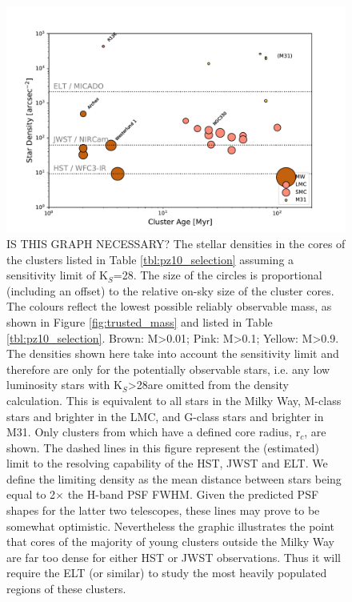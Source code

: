 \begin{figure}

    \centering
    \includegraphics[width=\textwidth]{images/star_density_vs_age.pdf}


    \caption{\rewrite IS THIS GRAPH NECESSARY? 
    The stellar densities in the cores of the clusters listed in Table \ref{tbl:pz10_selection} assuming a sensitivity limit of K$_S$=28\m. 
    The size of the circles is proportional (including an offset) to the relative on-sky size of the cluster cores. 
    The colours reflect the lowest possible reliably observable mass, as shown in Figure \ref{fig:trusted_mass} and listed in Table \ref{tbl:pz10_selection}. 
    Brown: M\textgreater0.01\msun; Pink: M\textgreater0.1\msun; Yellow: M\textgreater0.9\msun. 
    The densities shown here take into account the sensitivity limit and therefore are only for the potentially observable stars, i.e. any low luminosity stars with K$_S$\textgreater28\m are omitted from the density calculation. 
    This is equivalent to all stars in the Milky Way, M-class stars and brighter in     the LMC, and G-class stars and brighter in M31. 
    Only clusters from \citet{portegies2010} which have a defined core radius, r$_c$, are shown.
    The dashed lines in this figure represent the (estimated) limit to the resolving capability of the HST, JWST and ELT. 
    We define the limiting density as the mean distance between stars being equal to 2$\times$ the H-band PSF FWHM.
    Given the predicted PSF shapes for the latter two telescopes, these lines may prove to be somewhat optimistic. 
    Nevertheless the graphic illustrates the point that cores of the majority of young clusters outside the Milky Way are far too dense for either HST or JWST observations.
    Thus it will require the ELT (or similar) to study the most heavily populated regions of these clusters.}
    
    \label{fig:star_density_vs_age}
    
\end{figure}


